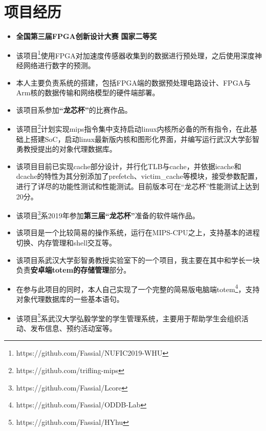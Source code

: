 \documentclass{resume}
\begin{document}
\section{{\bfseries 项目经历}}
\begin{itemize}[parsep=0.2ex]
	\item \textbf{全国第三届FPGA创新设计大赛}  \textbf{国家二等奖}
	\item 该项目\footnote{https://github.com/Fassial/NUFIC2019-WHU}使用FPGA对加速度传感器收集到的数据进行预处理，之后使用深度神经网络进行数字的预测。
	\item 本人主要负责系统的搭建，包括FPGA端的数据预处理电路设计、FPGA与Arm核的数据传输和网络模型的硬件端部署。
\end{itemize}
\begin{itemize}[parsep=0.2ex]
	\item 该项目系参加\textbf{“龙芯杯”}的比赛作品。
	\item 该项目\footnote{https://github.com/trifling-mips}计划实现mips指令集中支持启动linux内核所必备的所有指令，在此基础上搭建SoC，启动linux最新版内核和图形化界面，并编写运行武汉大学彭智勇教授提出的对象代理数据库。
	\item 该项目目前已实现cache部分设计，并行化TLB与cache，并依据icache和dcache的特性为其分别添加了prefetch、victim\_cache等模块，接受参数配置，进行了详尽的功能性测试和性能测试。目前版本可在“龙芯杯”性能测试上达到20分。
\end{itemize}
\begin{itemize}[parsep=0.2ex]
	\item 该项目\footnote{https://github.com/Fassial/Lcore}系2019年参加\textbf{第三届“龙芯杯”}准备的软件端作品。
	\item 该项目是一个比较简易的操作系统，运行在MIPS-CPU之上，支持基本的进程切换、内存管理和shell交互等。
\end{itemize}
\begin{itemize}[parsep=0.2ex]
	\item 该项目系武汉大学彭智勇教授实验室下的一个项目，我主要在其中和学长一块负责\textbf{安卓端totem的存储管理}部分。
	\item 在参与此项目的同时，本人自己实现了一个完整的简易版电脑端totem\footnote{https://github.com/Fassial/ODDB-Lab}，支持对象代理数据库的一些基本语句。
\end{itemize}
\begin{itemize}[parsep=0.2ex]
\item 该项目\footnote{https://github.com/Fassial/HYhu}系武汉大学弘毅学堂的学生管理系统，主要用于帮助学生会组织活动、发布信息、预约活动室等。
\end{itemize}
\end{document}

